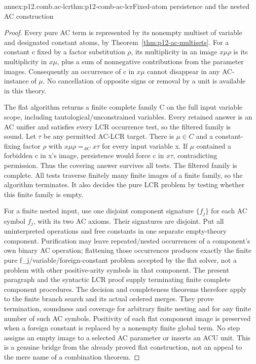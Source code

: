 \begin{annexitem}{annex:p12.comb.ac-lcr}{thm:p12-comb-ac-lcr}{Fixed-atom persistence and the nested AC construction}
\begin{proof}
Every pure AC term is represented by its nonempty multiset of variable
and designated constant atoms, by Theorem~\ref{thm:p12-ac-multisets}.
For a constant c fixed by a factor substitution \(\rho\), its
multiplicity in an image \(x\mu\rho\) is its multiplicity in
\(x\mu\), plus a sum of nonnegative contributions from the
parameter images. Consequently an occurrence of c in \(x\mu\)
cannot disappear in any AC-instance of \(\mu\). No cancellation
of opposite signs or removal by a unit is available in this theory.

The flat algorithm returns a finite complete family C on the full
input variable scope, including tautological/unconstrained variables.
Every retained answer is an AC unifier and satisfies every LCR
occurrence test, so the filtered family is sound. Let \(\tau\) be
any permitted AC-LCR target. There is \(\mu\in C\) and a
constant-fixing factor \(\rho\) with
\(x\mu\rho=_{AC}x\tau\) for every input variable x.
If \(\mu\) contained a forbidden c in x's image, persistence
would force c in \(x\tau\), contradicting permission. Thus the
covering answer survives all tests. The filtered family is complete.
All tests traverse finitely many finite images of a finite family,
so the algorithm terminates. It also decides the pure LCR problem
by testing whether this finite family is empty.

For a finite nested input, use one disjoint component signature
\(\{f_j\}\) for each AC symbol \(f_j\), with its two AC axioms.
Their signatures are disjoint. Put all uninterpreted operations and
free constants in one separate empty-theory component. Purification
may leave repeated/nested occurrences of a component's own binary
AC operation; flattening those occurrences produces exactly the
finite pure f_j/variable/foreign-constant problem accepted by the
flat solver, not a problem with other positive-arity symbols in
that component. The present paragraph and the syntactic LCR proof
supply terminating finite complete component procedures.
The decision and completeness theorems therefore apply to the
finite branch search and its actual ordered merges. They prove
termination, soundness and coverage for arbitrary finite nesting
and for any finite number of such AC symbols. Positivity of each
flat component image is preserved when a foreign constant is
replaced by a nonempty finite global term. No step assigns an
empty image to a selected AC parameter or inserts an ACU unit.
This is a genuine bridge from the already proved flat construction,
not an appeal to the mere name of a combination theorem.
\end{proof}
\end{annexitem}

